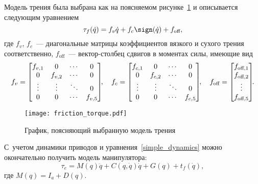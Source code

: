 Модель трения была выбрана как на поясняемом рисунке~\ref{img_friction_torque} и  описывается следующим уравнением \cite{siciliano2008springer}
\begin{equation}\label{eq_friction_torque}
	\tau_f(\dot{q}) = f_v \dot{q} + f_c \sign(\dot{q}) + f_\text{off},
\end{equation}
где $f_v$, $f_c$~--- диагональные матрицы коэффициентов вязкого и сухого трения соответственно, $f_\text{off}$~--- вектор-столбец сдвигов в моментах силы, имеющие вид
\begin{equation}
	f_v =
	\begin{bmatrix}
		f_{v,1} & 0 & \cdots & 0 \\
		0 & f_{v,2} & \cdots & 0 \\
		\vdots & \vdots & \ddots & 0 \\
		0 & 0 & \cdots & f_{v,5}
	\end{bmatrix}\!\!,
	\quad
	f_c =
	\begin{bmatrix}
		f_{c,1} & 0 & \cdots & 0 \\
		0 & f_{c,2} & \cdots & 0 \\
		\vdots & \vdots & \ddots & 0 \\
		0 & 0 & \cdots & f_{c,5}
	\end{bmatrix}\!\!,
	\quad
	f_\text{off} =
	\begin{bmatrix}
		f_{\text{off},1} \\ f_{\text{off},2} \\ \vdots \\ f_{\text{off},5}
	\end{bmatrix}\!\!\ldotp
\end{equation}

\begin{figure}[h!]
	\centering\texttt{[image: friction\_torque.pdf]}
	\caption{График, поясняющий выбранную модель трения}
	\label{img_friction_torque}
\end{figure}

С~учетом динамики приводов и уравнения~\eqref{simple_dynamics} можно окончательно получить модель манипулятора:
\begin{equation}\label{eq_model_with_standard_matrix}
\tau_e = M(q) \ddot{q} + C(q,\dot{q}) \dot{q} + G(q) + t_f(\dot{q}),
\end{equation}
где $M(q) = I_a + D(q)$.

